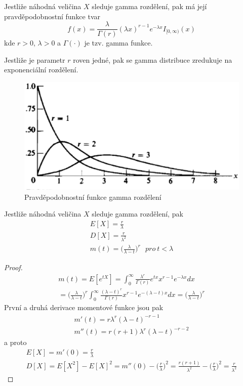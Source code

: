 \begin{definition}
Jestliže náhodná veličina $X$ sleduje gamma rozdělení, pak má její pravděpodobnostní funkce tvar
\begin{equation*}
f(x) = \frac{\lambda}{\Gamma(r)}(\lambda x)^{r - 1}e^{-\lambda x}I_{[0, \infty)}(x)
\end{equation*}
kde $r > 0$, $\lambda > 0$ a $\Gamma(\cdot)$ je tzv. gamma funkce.
\end{definition}
Jestliže je parametr $r$ roven jedné, pak se gamma distribuce zredukuje na exponenciální rozdělení.

\begin{figure}[htp]
\centering
\includegraphics[scale = 0.5]{pictures/gamma_distribution.eps}
\caption{Pravděpodobnostní funkce gamma rozdělení}
\label{gamma_distribution}
\end{figure}

\begin{theorem}
Jestliže náhodná veličina $X$ sleduje gamma rozdělení, pak
\begin{gather*}
E[X] = \frac{r}{\lambda}\\
D[X] = \frac{r}{\lambda^2}\\
m(t) = \Big(\frac{\lambda}{\lambda - t} \Big)^r~~~\textit{pro}~t < \lambda
\end{gather*}
\end{theorem}
\begin{proof}
\begin{gather*}
m(t) = E[e^{tX}] = \int_0^{\infty} \frac{\lambda^r}{\Gamma(r)}e^{tx}x^{r-1}e^{-\lambda x} dx\\
= \Big(\frac{\lambda}{\lambda - t} \Big)^r \int_0^{\infty} \frac{(\lambda - t)^r}{\Gamma(r)}x^{r-1}e^{-(\lambda - t)x}dx = \Big( \frac{\lambda}{\lambda - t} \Big)^r
\end{gather*}
První a druhá derivace momentové funkce jsou pak
\begin{gather*}
m'(t) = r \lambda^r (\lambda - t)^{-r - 1}\\
m''(t) = r(r + 1)\lambda^r(\lambda - t)^{-r-2}
\end{gather*}
a proto
\begin{gather*}
E[X] = m'(0) = \frac{r}{\lambda}\\
D[X] = E[X^2] - E[X]^2 = m''(0) - \Big(\frac{r}{\lambda}\Big)^2 = \frac{r(r+1)}{\lambda^2} - \Big(\frac{r}{\lambda}\Big)^2 = \frac{r}{\lambda^2}
\end{gather*}
\end{proof}

